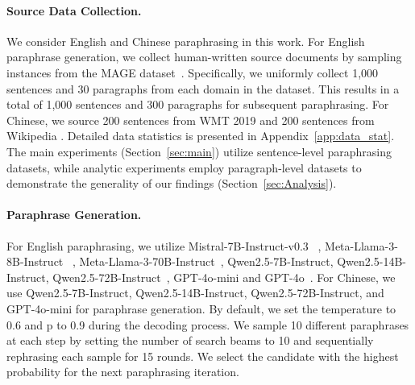 \paragraph{Source Data Collection.}
We consider English and Chinese paraphrasing in this work.
For English paraphrase generation, we collect human-written source documents by sampling instances from the MAGE dataset~\cite{li2023mage}.
Specifically, we uniformly collect 1,000 sentences and 30 paragraphs from each domain in the dataset.
This results in a total of 1,000 sentences and 300 paragraphs for subsequent paraphrasing.
For Chinese, we source 200 sentences from WMT 2019 \citep{barrault-etal-2019-findings} and 200 sentences from Wikipedia \cite{wikidump}. 
Detailed data statistics is presented in Appendix~\ref{app:data_stat}.
The main experiments (Section~\ref{sec:main}) utilize sentence-level paraphrasing datasets, while analytic experiments employ paragraph-level datasets to demonstrate the generality of our findings (Section~\ref{sec:Analysis}).

\paragraph{Paraphrase Generation.}
For English paraphrasing, we utilize Mistral-7B-Instruct-v0.3 ~\cite{jiang2023mistral7b}, Meta-Llama-3-8B-Instruct ~\cite{touvron2023llama2openfoundation}, Meta-Llama-3-70B-Instruct~\cite{touvron2023llama2openfoundation}, Qwen2.5-7B-Instruct, Qwen2.5-14B-Instruct, Qwen2.5-72B-Instruct~\cite{qwen2}, GPT-4o-mini and GPT-4o~\cite{openai2024gpt4technicalreport}.
For Chinese, we use  Qwen2.5-7B-Instruct, Qwen2.5-14B-Instruct, Qwen2.5-72B-Instruct, and GPT-4o-mini for paraphrase generation.
By default, we set the temperature to 0.6 and p to 0.9 during the decoding process.
We sample 10 different paraphrases at each step by setting the number of search beams to 10 and sequentially rephrasing each sample for 15 rounds. 
We select the candidate with the highest probability for the next paraphrasing iteration. 

